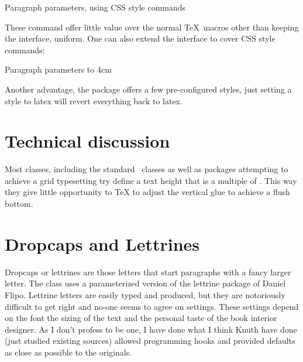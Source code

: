 \begin{texexample}{Paragraph parameters, using CSS style commands}{}{}

\lipsum[1]

\linenottooshort[20em]

\lipsum[1-2]
\lorem

\end{texexample}

These command offer little value over the normal \TeX\ macros other than keeping the interface, uniform. One can also extend the interface to cover CSS style commands:

\begin{texexample}{Paragraph parameters}{}
\vbox to 4cm{\lipsum*[1]}
\end{texexample}

Another advantage, the package offers a few pre-configured styles, just setting a style to latex will revert everything back to latex.

\section{Technical discussion}

Most classes, including the standard \LaTeXe\ classes as well as packages attempting to achieve a grid typesetting try define a text height that is a multiple of . This way they give little opportunity to TeX to adjust the vertical glue to achieve a flush bottom.

\section{Dropcaps and Lettrines}

Dropcaps or lettrines are those letters that start paragraphs with a fancy larger letter. The class uses a parameterized version of the lettrine package of Daniel Flipo. Lettrine letters are easily typed and produced, but they are notoriously difficult to get right and no-one seems to agree on settings. These settings depend on the font the sizing of the text and the personal taste of the book interior designer. As I don't profess to be one, I have done what I think Knuth have done (just studied existing sources) allowed programming hooks and provided defaults as close as possible to the originals.



